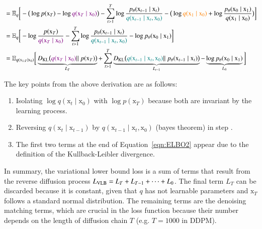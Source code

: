 \begin{equation}
\begin{split}
        & = \mathbb{E}_{q}\bigg[-\big(\log p(\mathrm{x}_{T}) - \log \textcolor{violet}{q(\mathrm{x}_{T}\mid\mathrm{x}_{0})}\big) - \sum_{t>1}^{T} \log \frac{p_{\theta}(\mathrm{x}_{t-1}\mid\mathrm{x}_{t})}{\textcolor{teal}{q(\mathrm{x}_{t-1}\mid\mathrm{x}_{t}, \mathrm{x}_{0})}} - \big( \log\textcolor{orange}{q(\mathrm{x}_{1}\mid\mathrm{x}_{0})}  +\log\frac{p_{\theta}(\mathrm{x}_{0}\mid\mathrm{x}_{1})}{q(\mathrm{x}_{1}\mid\mathrm{x}_{0})}\big)\bigg]  \\ 
        & = \mathbb{E}_{q}\bigg[-\log \frac{p(\mathrm{x}_{T})}{\textcolor{violet}{q(\mathrm{x}_{T}\mid\mathrm{x}_{0})}} - \sum_{t>1}^{T} \log \frac{p_{\theta}(\mathrm{x}_{t-1}\mid\mathrm{x}_{t})}{\textcolor{teal}{q(\mathrm{x}_{t-1}\mid\mathrm{x}_{t}, \mathrm{x}_{0})}} -  \log p_{\theta}(\mathrm{x}_{0}\mid\mathrm{x}_{1})\bigg]  \\
        & = \mathbb{E}_{q(\mathrm{x}_{1:T}\mid\mathrm{x}_{0})}\bigg[\underbrace{D_{\text{\scriptsize{KL}}}\big(\textcolor{violet}{q(\mathrm{x}_{T}\mid\mathrm{x}_{0})} ||~p(\mathrm{x}_{T}) \big)}_{L_{T}} + \sum_{t>1}^{T} \underbrace{D_{\text{\scriptsize{KL}}}\big( \textcolor{teal}{q(\mathrm{x}_{t-1}\mid\mathrm{x}_{t}, \mathrm{x}_{0})}||~p_{\theta}(\mathrm{x}_{t-1}\mid\mathrm{x}_{t}) \big)}_{L_{t-1}} -  \underbrace{\log p_{\theta}(\mathrm{x}_{0}\mid\mathrm{x}_{1})}_{L_{0}} \bigg]
    \end{split}
\end{equation}

\noindent The key points from the above derivation are as follows: 
\begin{enumerate}
    \item Isolating  $\log q(\mathrm{x}_{t}\mid\mathrm{x}_{0})$ with $\log p(\mathrm{x}_{T})$ because both are invariant by the learning process.
    \item Reversing $q(\mathrm{x}_{t}\mid\mathrm{x}_{t-1})$ by $q(\mathrm{x}_{t-1}\mid\mathrm{x}_{t}, \mathrm{x}_{0})$ (bayes theorem) in step . 
    \item The first two terms at the end of Equation~\ref{eqn:ELBO2} appear due to the definition of the Kullback-Leibler divergence. 
\end{enumerate}
    
\noindent In summary, the variational lower bound loss is a sum of terms that result from the reverse diffusion process $L_{\text{\scriptsize{\text{VLB}}}}=L_{T} + L_{T-1} + \dots + L_{0}$. The final term $L_{T}$ can be discarded because
it is constant, given that $q$ has not learnable parameters and $\mathrm{x}_{T}$ follows a standard normal distribution. The remaining terms are the denoising matching terms, which are crucial in the loss function because their number depends on the length of diffusion chain $T$ (e.g. $T=1000$ in DDPM).\\

